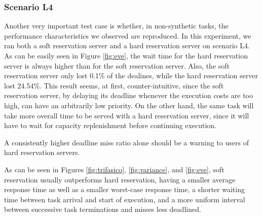 \documentclass[times, 10pt,twocolumn]{article}
\begin{document}
\subsubsection{Scenario L4}
\label{sec:scenario-l4}

Another very important test case is whether, in non-synthetic tasks,
the performance characteristics we observed are reproduced. In this
experiment, we ran both a soft reservation server and a hard
reservation server on scenario L4. As can be easily seen in Figure
\ref{fig:eve}, the wait time for the hard reservation server is always
higher than for the soft reservation server. Also, the soft
reservation server only lost 0.1\% of the dealines, while the hard
reservation server lost 24.54\%. This result seems, at first,
counter-intuitive, since the soft reservation server, by delaying its
deadline whenever the execution costs are too high, can have an
arbitrarily low priority. On the other hand, the same task will take
more overall time to be served with a hard reservation server, since
it will have to wait for capacity replenishment before continuing
execution.

\label{sec:conclusion}

A consistently higher deadline miss ratio alone should be a warning to
users of hard reservation servers.

As can be seen in Figures \ref{fig:trifasico}, \ref{fig:variance}, and
\ref{fig:eve}, soft reservation usually outperforms hard reservation,
having a smaller average response time as well as a smaller worst-case
response time, a shorter waiting time between task arrival and start
of execution, and a more uniform interval between successive task
terminations and misses less deadlined.



\end{document}
